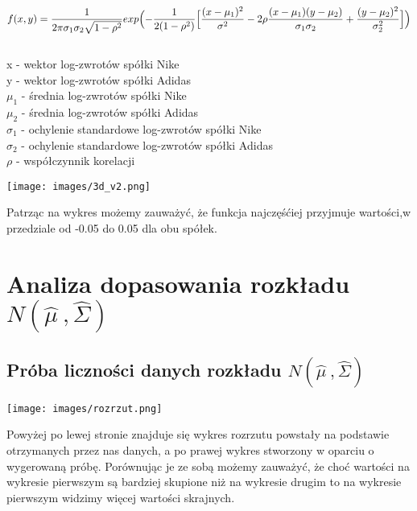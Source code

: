 \documentclass[a4paper,11pt]{article}
\begin{document}
\large
$$f(x,y)=\frac{1}{2\pi\sigma_{1}\sigma_{2}\sqrt{1-\rho^2}}exp\Bigl(-\frac{1}{2(1-\rho^2)}\Bigr[\frac{(x-\mu_{1})^2}{\sigma^2}-2\rho\frac{(x-\mu_{1})(y-\mu_{2})}{\sigma_{1}\sigma_{2}}+\frac{(y-\mu_{2})^2}{\sigma_{2}^2}\Bigr]\Bigl)$$
\\


\large
\setlength\parindent{0pt}
x - wektor log-zwrotów spółki Nike \\
y - wektor log-zwrotów spółki Adidas \\
$\mu_{1}$ - średnia log-zwrotów spółki  Nike \\
$\mu_{2}$ - średnia log-zwrotów spółki Adidas \\
$\sigma_{1}$ - ochylenie standardowe log-zwrotów spółki  Nike \\ 
$\sigma_{2}$ - ochylenie standardowe log-zwrotów spółki Adidas \\
$\rho$ - współczynnik korelacji




\begin{center}
\texttt{[image: images/3d\_v2.png]}
\begin{flushleft}

{Patrząc na wykres możemy zauważyć, że funkcja najczęśćiej przyjmuje wartości,w przedziale od -0.05 do 0.05 dla obu spółek.}
\end{flushleft}
\end{center}


\section{Analiza dopasowania rozkładu $N(\hat{\mu}\:, \hat{\Sigma})$}
\subsection{Próba liczności danych rozkładu $N(\hat{\mu}\:, \hat{\Sigma})$}
\begin{center}
\texttt{[image: images/rozrzut.png]}
\end{center}
\begin{flushleft}
{Powyżej po lewej stronie znajduje się wykres rozrzutu powstały na podstawie otrzymanych przez nas danych, a po prawej wykres stworzony w oparciu o wygerowaną próbę. Porównując je ze sobą możemy zauważyć, że choć wartości na  wykresie pierwszym są bardziej skupione niż na wykresie drugim  to na wykresie pierwszym widzimy więcej wartości skrajnych.
}
\end{flushleft}
\end{document}
